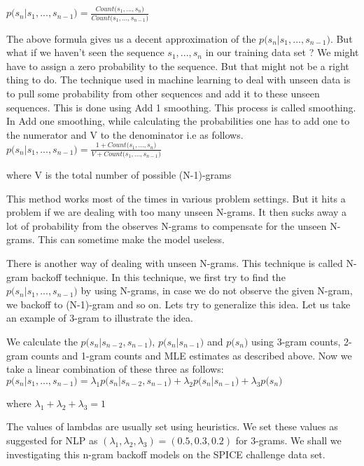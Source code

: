 \documentclass{article} %
\begin{document}
$p\big(s_{n}|s_1, . . . , s_{n-1}\big) = \frac{Count\big(s_1, . . . , s_{n}\big)}{Count\big(s_1, . . . , s_{n-1}\big)}$

The above formula gives us a decent approximation of the $p\big(s_{n}|s_1, . . . , s_{n−1}\big)$. But what if we haven't seen the sequence $s_1, . . . , s_{n}$ in our training data set ? We might have to assign a zero probability to the sequence. But that might not be a right thing to do. The technique used in machine learning to deal with unseen data is to pull some probability from other sequences and add it to these unseen sequences. This is done using Add 1 smoothing. This process is called smoothing. In Add one smoothing, while calculating the probabilities one has to add one to the numerator and V to the denominator i.e as follows.\\
$p\big(s_{n}|s_1, . . . , s_{n-1}\big) = \frac{1 + Count\big(s_1, . . . , s_{n}\big)}{V + Count\big(s_1, . . . , s_{n-1}\big)}$

where V is the total number of possible (N-1)-grams 

This method works most of the times in various problem settings. But it hits a problem if we are dealing with too many unseen N-grams. It then sucks away a lot of probability from the observes N-grams to compensate for the unseen N-grams. This can sometime make the model useless. 

There is another way of dealing with unseen N-grams. This technique is called N-gram backoff technique. In this technique, we first try to find the $p\big(s_{n}|s_1, . . . , s_{n-1}\big)$ by using N-grams, in case we do not observe the given N-gram, we backoff to (N-1)-gram and so on. Lets try to generalize this idea. Let us take an example of 3-gram to illustrate the idea.

We calculate the $p\big(s_{n}|s_{n-2},s_{n-1}\big)$, $p\big(s_{n}|s_{n-1}\big)$ and $p\big(s_{n}\big)$ using 3-gram counts, 2-gram counts and 1-gram counts and MLE estimates as described above. Now we take a linear combination of these three as follows:\\

$p\big(s_{n}|s_1, . . . , s_{n-1}\big) = \lambda_1p\big(s_{n}|s_{n-2},s_{n-1}\big) + \lambda_2p\big(s_{n}|s_{n-1}\big) + \lambda_3p\big(s_{n}\big)$ 

where $\lambda_1 + \lambda_2 + \lambda_3 = 1$

The values of lambdas are usually set using heuristics. We set these values as suggested for NLP as $(\lambda_1, \lambda_2, \lambda_3) = (0.5, 0.3, 0.2)$ for 3-grams.
We shall we investigating this n-gram backoff models on the SPICE challenge data set.
\end{document}
